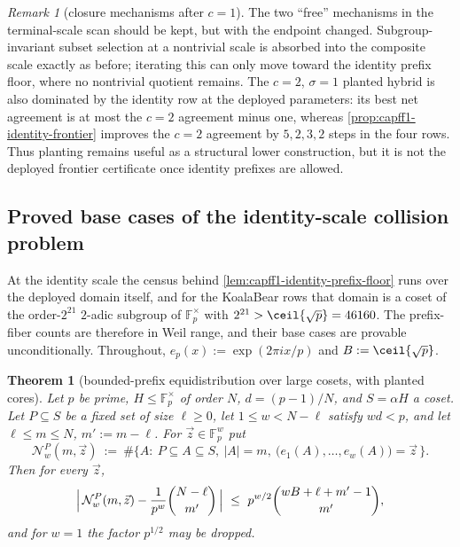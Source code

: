 \documentclass[11pt]{article}
\newtheorem{theorem}{Theorem}[section]
\theoremstyle{definition}
\theoremstyle{remark}
\newtheorem{remark}[remark]{Remark}
\newcommand{\F}{\mathbb{F}}
\begin{document}
\begin{remark}[closure mechanisms after $c=1$]\label{rem:capff1-closure}
The two ``free'' mechanisms in the terminal-scale scan should be kept, but with the endpoint changed.  Subgroup-invariant subset selection at a nontrivial scale is absorbed into the composite scale exactly as before; iterating this can only move toward the identity prefix floor, where no nontrivial quotient remains.  The $c=2$, $\sigma=1$ planted hybrid is also dominated by the identity row at the deployed parameters: its best net agreement is at most the $c=2$ agreement minus one, whereas \cref{prop:capff1-identity-frontier} improves the $c=2$ agreement by $5,2,3,2$ steps in the four rows.  Thus planting remains useful as a structural lower construction, but it is not the deployed frontier certificate once identity prefixes are allowed.
\end{remark}

\subsection{Proved base cases of the identity-scale collision problem}

At the identity scale the census behind \cref{lem:capff1-identity-prefix-floor} runs over the deployed domain itself, and for the KoalaBear rows that domain is a coset of the order-$2^{21}$ $2$-adic subgroup of $\F_p^\times$ with $2^{21}>\ceil{\sqrt p}=46160$.  The prefix-fiber counts are therefore in Weil range, and their base cases are provable unconditionally.  Throughout, $e_p(x):=\exp(2\pi ix/p)$ and $B:=\ceil{\sqrt p}$.

\begin{theorem}[bounded-prefix equidistribution over large cosets, with planted cores]\label{thm:capff1-collision-base}
Let $p$ be prime, $H\le\F_p^\times$ of order $N$, $d=(p-1)/N$, and $S=\alpha H$ a coset.  Let $P\subseteq S$ be a fixed set of size $\ell\ge0$, let $1\le w<N-\ell$ satisfy $wd<p$, and let $\ell\le m\le N$, $m':=m-\ell$.  For $\vec z\in\F_p^w$ put
\[
        \mathcal N_w^P(m,\vec z)\ :=\ \#\bigl\{A:\ P\subseteq A\subseteq S,\ |A|=m,\ \bigl(e_1(A),\ldots,e_w(A)\bigr)=\vec z\,\bigr\}.
\]
Then for every $\vec z$,
\[
        \Bigl|\,\mathcal N_w^P(m,\vec z)-\frac1{p^w}\binom{N-\ell}{m'}\,\Bigr|
        \ \le\ p^{w/2}\binom{wB+\ell+m'-1}{m'},
\]
and for $w=1$ the factor $p^{1/2}$ may be dropped.
\end{theorem}
\end{document}
